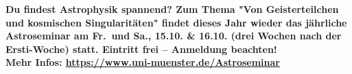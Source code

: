 \begin{landscape}
\smallskip

\textbf{Du findest Astrophysik spannend?
	Zum Thema "Von Geisterteilchen und kosmischen Singularitäten" findet dieses Jahr wieder das jährliche \mbox{Astroseminar} am Fr.\ und Sa., 15.10. \& 16.10. (drei Wochen nach der Ersti-Woche) statt.
	Eintritt frei -- Anmeldung beachten!\\
	Mehr Infos: \url{https://www.uni-muenster.de/Astroseminar}}
\end{landscape}
